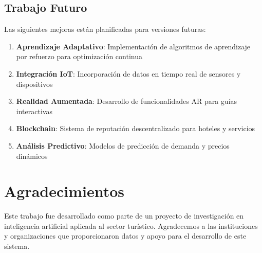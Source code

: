 \documentclass[runningheads]{llncs}
\begin{document}
\subsection{Trabajo Futuro}

Las siguientes mejoras están planificadas para versiones futuras:

\begin{enumerate}
\item \textbf{Aprendizaje Adaptativo}: Implementación de algoritmos de aprendizaje por refuerzo para optimización continua
\item \textbf{Integración IoT}: Incorporación de datos en tiempo real de sensores y dispositivos
\item \textbf{Realidad Aumentada}: Desarrollo de funcionalidades AR para guías interactivas
\item \textbf{Blockchain}: Sistema de reputación descentralizado para hoteles y servicios
\item \textbf{Análisis Predictivo}: Modelos de predicción de demanda y precios dinámicos
\end{enumerate}

\section{Agradecimientos}

Este trabajo fue desarrollado como parte de un proyecto de investigación en inteligencia artificial aplicada al sector turístico. Agradecemos a las instituciones y organizaciones que proporcionaron datos y apoyo para el desarrollo de este sistema.
\end{document}
